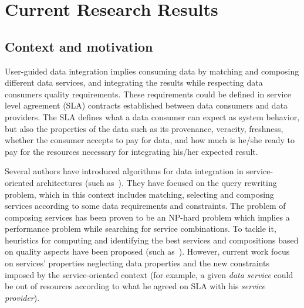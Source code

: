 \chapter{Current Research Results}
\label{chap:context}
\minitoc

\section{Context and motivation}

User-guided data integration implies consuming data by matching and composing different data services, and integrating the results while respecting data consumers quality requirements. 
%
These requirements could be defined in service level agreement (SLA) contracts 
established between data consumers and data providers.
%
The SLA defines what a data consumer can expect as system behavior, 
but also the properties of the data such as its provenance, veracity, freshness, whether the consumer accepts to pay for data, and how much is he/she ready to pay for the resources necessary for integrating his/her expected result. 

%
Several authors have introduced algorithms for data integration in service-oriented architectures (such as~\cite{Barhamgi2010,Umberto,Benouaret2011,ba2014}).
%
They have focused on the query rewriting problem, which in this context includes matching, selecting and composing services
according to some data requirements and constraints. 
%
The problem of composing services has been proven to be an NP-hard problem which implies a performance problem while searching for service combinations.
%
To tackle it, heuristics for computing and identifying the best services and compositions based on quality aspects have been proposed (such as~\cite{Cardoso2004,Berbner2006,Menasce:2008,Sasikaladevi2014}).
%
However, current work focus on services' properties neglecting data properties and the new constraints imposed by the service-oriented context (for example, a given \textsl{data service} could be out of resources according to what he agreed on  SLA with his \textsl{service provider}). 

